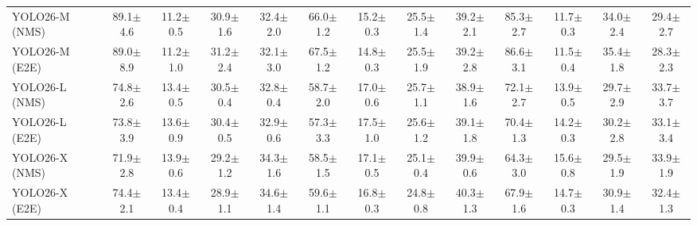 \begin{table}[!thb]
{\begin{tabular}{lcccccccccccc}
YOLO26-M (NMS) & 89.1{\scriptsize$\pm$4.6} & 11.2{\scriptsize$\pm$0.5} & 30.9{\scriptsize$\pm$1.6} & 32.4{\scriptsize$\pm$2.0} & 66.0{\scriptsize$\pm$1.2} & 15.2{\scriptsize$\pm$0.3} & 25.5{\scriptsize$\pm$1.4} & 39.2{\scriptsize$\pm$2.1} & 85.3{\scriptsize$\pm$2.7} & 11.7{\scriptsize$\pm$0.3} & 34.0{\scriptsize$\pm$2.4} & 29.4{\scriptsize$\pm$2.7} \\
YOLO26-M (E2E) & 89.0{\scriptsize$\pm$8.9} & 11.2{\scriptsize$\pm$1.0} & 31.2{\scriptsize$\pm$2.4} & 32.1{\scriptsize$\pm$3.0} & 67.5{\scriptsize$\pm$1.2} & 14.8{\scriptsize$\pm$0.3} & 25.5{\scriptsize$\pm$1.9} & 39.2{\scriptsize$\pm$2.8} & 86.6{\scriptsize$\pm$3.1} & 11.5{\scriptsize$\pm$0.4} & 35.4{\scriptsize$\pm$1.8} & 28.3{\scriptsize$\pm$2.3} \\
YOLO26-L (NMS) & 74.8{\scriptsize$\pm$2.6} & 13.4{\scriptsize$\pm$0.5} & 30.5{\scriptsize$\pm$0.4} & 32.8{\scriptsize$\pm$0.4} & 58.7{\scriptsize$\pm$2.0} & 17.0{\scriptsize$\pm$0.6} & 25.7{\scriptsize$\pm$1.1} & 38.9{\scriptsize$\pm$1.6} & 72.1{\scriptsize$\pm$2.7} & 13.9{\scriptsize$\pm$0.5} & 29.7{\scriptsize$\pm$2.9} & 33.7{\scriptsize$\pm$3.7} \\
YOLO26-L (E2E) & 73.8{\scriptsize$\pm$3.9} & 13.6{\scriptsize$\pm$0.9} & 30.4{\scriptsize$\pm$0.5} & 32.9{\scriptsize$\pm$0.6} & 57.3{\scriptsize$\pm$3.3} & 17.5{\scriptsize$\pm$1.0} & 25.6{\scriptsize$\pm$1.2} & 39.1{\scriptsize$\pm$1.8} & 70.4{\scriptsize$\pm$1.3} & 14.2{\scriptsize$\pm$0.3} & 30.2{\scriptsize$\pm$2.8} & 33.1{\scriptsize$\pm$3.4} \\
YOLO26-X (NMS) & 71.9{\scriptsize$\pm$2.8} & 13.9{\scriptsize$\pm$0.6} & 29.2{\scriptsize$\pm$1.2} & 34.3{\scriptsize$\pm$1.6} & 58.5{\scriptsize$\pm$1.5} & 17.1{\scriptsize$\pm$0.5} & 25.1{\scriptsize$\pm$0.4} & 39.9{\scriptsize$\pm$0.6} & 64.3{\scriptsize$\pm$3.0} & 15.6{\scriptsize$\pm$0.8} & 29.5{\scriptsize$\pm$1.9} & 33.9{\scriptsize$\pm$1.9} \\
YOLO26-X (E2E) & 74.4{\scriptsize$\pm$2.1} & 13.4{\scriptsize$\pm$0.4} & 28.9{\scriptsize$\pm$1.1} & 34.6{\scriptsize$\pm$1.4} & 59.6{\scriptsize$\pm$1.1} & 16.8{\scriptsize$\pm$0.3} & 24.8{\scriptsize$\pm$0.8} & 40.3{\scriptsize$\pm$1.3} & 67.9{\scriptsize$\pm$1.6} & 14.7{\scriptsize$\pm$0.3} & 30.9{\scriptsize$\pm$1.4} & 32.4{\scriptsize$\pm$1.3} \\
\bottomrule
\end{tabular}
}
\end{table}